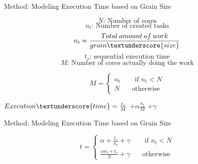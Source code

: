 \documentclass[10pt]{beamer}
\begin{document}
\begin{frame}{Method: Modeling Execution Time based on Grain Size}
	\begin{outline}	

		$$N\text{: Number of cores}$$	
		$$n_t \text{: Number of created tasks}	$$
		$$n_t=\frac{Total\:amount\:of\:work}{grain\textunderscore{size}}$$
		$$t_s\text{: sequential execution time}$$
		$$M\text{: Number of cores actually doing the work}$$

		$$M=\left\{
		\begin{aligned}
		n_t  \:\:\:\:\:\:\:\:      \text{ if } n_t<N\\
		N\:\:\:\:\:\:\:\:     \text{otherwise}
		\end{aligned}
		\right.$$
		
		\pause
		$Execution\textunderscore{time}=\frac{t_s}{M}$
		\pause
		$+\alpha\frac{n_t}{M}$
		\pause
		$+\gamma$
	\end{outline}
\end{frame}

\begin{frame}{Method: Modeling Execution Time based on Grain Size}
\begin{outline}		
	$$t=\left\{
	\begin{aligned}
		\alpha+\frac{t_s}{n_t}+\gamma  \:\:\:\:\:\:\:\:      \text{ if } n_t<N\\
		\frac{\alpha{n_t}+t_s}{N}+\gamma\:\:\:\:\:\:\:\:     \text{otherwise}
	\end{aligned}
	\right.$$


\end{outline}
\end{frame}
\end{document}
